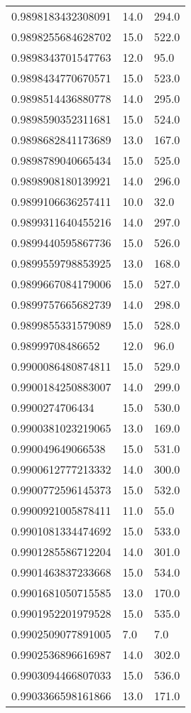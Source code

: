 \begin{center}
\begin{supertabular}[H]{p{0.30\textwidth}p{0.05\textwidth}p{0.05\textwidth}}
0.9898183432308091 & 14.0 & 294.0 \\ 
0.9898255684628702 & 15.0 & 522.0 \\ 
0.9898343701547763 & 12.0 & 95.0 \\ 
0.9898434770670571 & 15.0 & 523.0 \\ 
0.9898514436880778 & 14.0 & 295.0 \\ 
0.9898590352311681 & 15.0 & 524.0 \\ 
0.9898682841173689 & 13.0 & 167.0 \\ 
0.9898789040665434 & 15.0 & 525.0 \\ 
0.9898908180139921 & 14.0 & 296.0 \\ 
0.9899106636257411 & 10.0 & 32.0 \\ 
0.9899311640455216 & 14.0 & 297.0 \\ 
0.9899440595867736 & 15.0 & 526.0 \\ 
0.9899559798853925 & 13.0 & 168.0 \\ 
0.9899667084179006 & 15.0 & 527.0 \\ 
0.9899757665682739 & 14.0 & 298.0 \\ 
0.9899855331579089 & 15.0 & 528.0 \\ 
0.98999708486652 & 12.0 & 96.0 \\ 
0.9900086480874811 & 15.0 & 529.0 \\ 
0.9900184250883007 & 14.0 & 299.0 \\ 
0.9900274706434 & 15.0 & 530.0 \\ 
0.9900381023219065 & 13.0 & 169.0 \\ 
0.990049649066538 & 15.0 & 531.0 \\ 
0.9900612777213332 & 14.0 & 300.0 \\ 
0.9900772596145373 & 15.0 & 532.0 \\ 
0.9900921005878411 & 11.0 & 55.0 \\ 
0.9901081334474692 & 15.0 & 533.0 \\ 
0.9901285586712204 & 14.0 & 301.0 \\ 
0.9901463837233668 & 15.0 & 534.0 \\ 
0.9901681050715585 & 13.0 & 170.0 \\ 
0.9901952201979528 & 15.0 & 535.0 \\ 
0.9902509077891005 & 7.0 & 7.0 \\ 
0.9902536896616987 & 14.0 & 302.0 \\ 
0.9903094466807033 & 15.0 & 536.0 \\ 
0.9903366598161866 & 13.0 & 171.0 \\ 

\end{supertabular}
\end{center}
